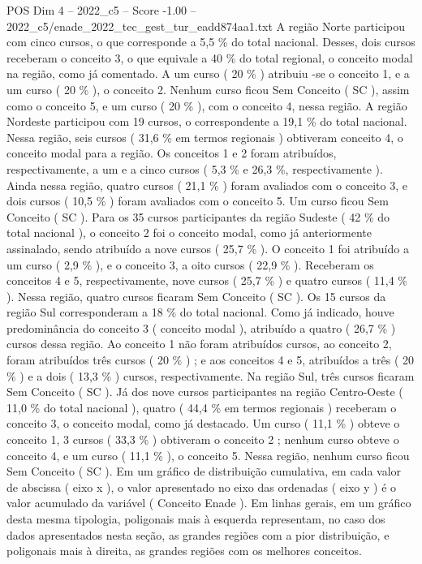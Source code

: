 \begin{textsample}{POS Dim 4 – 2022\_c5 – Score -1.00 – 2022\_c5/enade\_2022\_tec\_gest\_tur\_eadd874aa1.txt}
A região Norte participou com cinco cursos, o que corresponde a 5,5 \% do total nacional.
Desses, dois cursos receberam o conceito 3, o que equivale a 40 \% do total regional, o conceito modal na região, como já comentado.
A um curso ( 20 \% ) atribuiu -se o conceito 1, e a um curso ( 20 \% ), o conceito 2.
Nenhum curso ficou Sem Conceito ( SC ), assim como o conceito 5, e um curso ( 20 \% ), com o conceito 4, nessa região.
A região Nordeste participou com 19 cursos, o correspondente a 19,1 \% do total nacional.
Nessa região, seis cursos ( 31,6 \% em termos regionais ) obtiveram conceito 4, o conceito modal para a região.
Os conceitos 1 e 2 foram atribuídos, respectivamente, a um e a cinco cursos ( 5,3 \% e 26,3 \%, respectivamente ).
Ainda nessa região, quatro cursos ( 21,1 \% ) foram avaliados com o conceito 3, e dois cursos ( 10,5 \% ) foram avaliados com o conceito 5.
Um curso ficou Sem Conceito ( SC ).
Para os 35 cursos participantes da região Sudeste ( 42 \% do total nacional ), o conceito 2 foi o conceito modal, como já anteriormente assinalado, sendo atribuído a nove cursos ( 25,7 \% ).
O conceito 1 foi atribuído a um curso ( 2,9 \% ), e o conceito 3, a oito cursos ( 22,9 \% ).
Receberam os conceitos 4 e 5, respectivamente, nove cursos ( 25,7 \% ) e quatro cursos ( 11,4 \% ).
Nessa região, quatro cursos ficaram Sem Conceito ( SC ).
Os 15 cursos da região Sul corresponderam a 18 \% do total nacional.
Como já indicado, houve predominância do conceito 3 ( conceito modal ), atribuído a quatro ( 26,7 \% ) cursos dessa região.
Ao conceito 1 não foram atribuídos cursos, ao conceito 2, foram atribuídos três cursos ( 20 \% ) ; e aos conceitos 4 e 5, atribuídos a três ( 20 \% ) e a dois ( 13,3 \% ) cursos, respectivamente.
Na região Sul, três cursos ficaram Sem Conceito ( SC ).
Já dos nove cursos participantes na região Centro-Oeste ( 11,0 \% do total nacional ), quatro ( 44,4 \% em termos regionais ) receberam o conceito 3, o conceito modal, como já destacado.
Um curso ( 11,1 \% ) obteve o conceito 1, 3 cursos ( 33,3 \% ) obtiveram o conceito 2 ; nenhum curso obteve o conceito 4, e um curso ( 11,1 \% ), o conceito 5.
Nessa região, nenhum curso ficou Sem Conceito ( SC ).
Em um gráfico de distribuição cumulativa, em cada valor de abscissa ( eixo x ), o valor apresentado no eixo das ordenadas ( eixo y ) é o valor acumulado da variável ( Conceito Enade ).
Em linhas gerais, em um gráfico desta mesma tipologia, poligonais mais à esquerda representam, no caso dos dados apresentados nesta seção, as grandes regiões com a pior distribuição, e poligonais mais à direita, as grandes regiões com os melhores conceitos.

\end{textsample}
